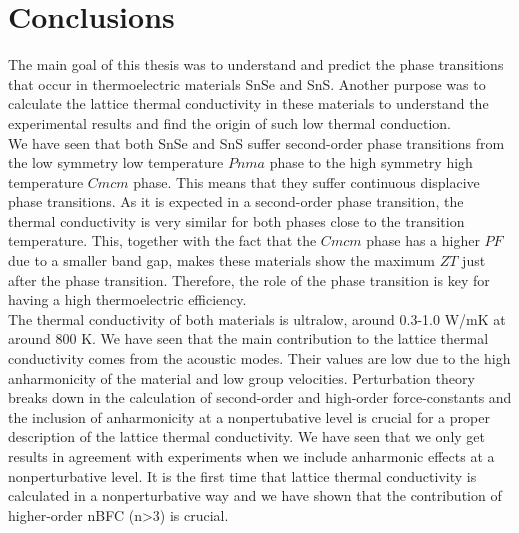 
\chapter*{Conclusions} %

\label{Chapter9} %


The main goal of this thesis was to understand and predict the phase transitions that occur in thermoelectric 
materials SnSe and SnS. Another purpose was to calculate the lattice thermal conductivity in these 
materials to understand the experimental results and find the origin of such low thermal conduction. \\

We have seen that both SnSe and SnS suffer second-order phase transitions from the low symmetry low temperature 
$Pnma$ phase to the high symmetry high temperature $Cmcm$ phase. This means that they suffer continuous displacive 
phase transitions. As it is expected in a second-order phase transition, the thermal conductivity is very similar 
for both phases close to the transition temperature. This, together with the fact that the $Cmcm$ phase has a 
higher $PF$ due to a smaller band gap, makes these materials show the maximum $ZT$ just after the phase 
transition. Therefore, the role of the phase transition is key for having a high thermoelectric efficiency. \\

The thermal conductivity of both materials is ultralow, around 0.3-1.0 W/mK at around $800$ K. We have seen that the 
main contribution to the lattice thermal conductivity comes from the acoustic modes. Their values are low due to the 
high anharmonicity of the material and low group velocities. Perturbation theory breaks down in the calculation of 
second-order and high-order force-constants and the inclusion of anharmonicity at a nonpertubative level is crucial 
for a proper description of the lattice thermal conductivity. We have seen that we only get results in agreement 
with experiments when we include anharmonic effects at a nonperturbative level. It is the first time that lattice 
thermal conductivity is calculated in a nonperturbative way and we have shown that the contribution of higher-order 
nBFC (n>3) is crucial.  \\

